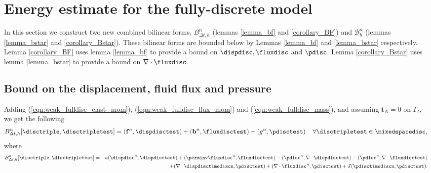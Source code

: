 \section{Energy estimate for the fully-discrete model}
\label{sec:energy}

In this section we construct two new combined bilinear forms, $B^n_{\Delta t,h}$ (lemmas \ref{lemma_bf} and \ref{corollary_BF}) and $\mathcal{B}_{h}^{n}$ (lemmas \ref{lemma_bstar} and \ref{corollary_Bstar}). These bilinear forms are bounded below by Lemmas \ref{lemma_bf} and \ref{lemma_bstar} respectively. Lemma \ref{corollary_BF} uses lemma \ref{lemma_bf} to provide a bound on $\dispdisc, \fluxdisc$ and $\pdisc$. Lemma \ref{corollary_Bstar} uses lemma \ref{lemma_bstar} to provide a bound on $\nabla \cdot \fluxdisc$.


\subsection{Bound on the displacement, fluid flux and pressure}
\label{sec:linear_form_one}
Adding (\ref{eqn:weak_fulldisc_elast_mom}), (\ref{eqn:weak_fulldisc_flux_mom}) and (\ref{eqn:weak_fulldisc_mass}), and assuming
$\mathbf{t}_{N}=0$ on $\Gamma_{t}$, we get the following
\begin{equation}
\label{eqn:B_weakform}
B_{\Delta t,h}^{n}[\disctriple,\disctripletest] =  (\mathbf{f}^{n},\dispdisctest) +  (\mathbf{b}^{n},\fluxdisctest)    +(g^{n},\pdisctest) \;\;\;\; \forall \disctripletest \in \mixedspacedisc,
\end{equation}
where
\begin{eqnarray*}
\label{eqn:BF}
B_{\Delta t,h}^{n}[\disctriple,\disctripletest] &=&  a(\dispdisc^{n},\dispdisctest)+   (\perminv \fluxdisc^{n}, \fluxdisctest) -   (\pdisc^{n}, \nabla \cdot \dispdisctest)  -  (\pdisc^{n}, \nabla \cdot \fluxdisctest) \\
&& + (\nabla \cdot\dispdisctimediscn,\pdisctest) +  ( \nabla \cdot \fluxdisc^{n}, \pdisctest) + J(\pdisctimediscn,\pdisctest).
\end{eqnarray*}

